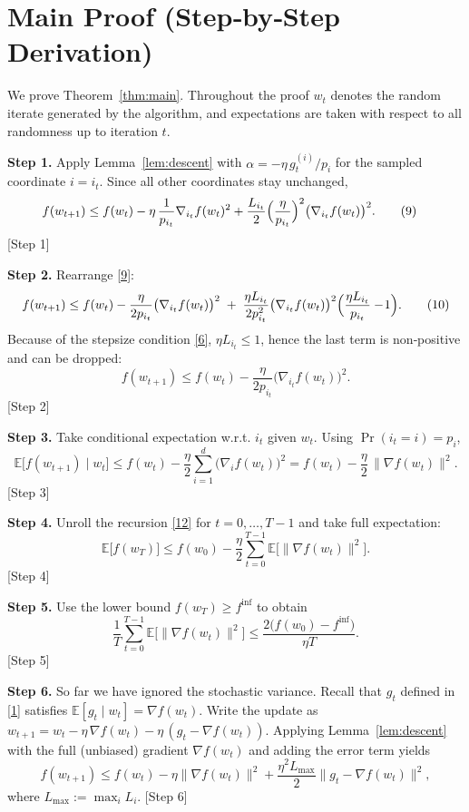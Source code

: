 \documentclass[11pt]{article}
\newcommand{\E}{\mathbb{E}}
\begin{document}
\section*{Main Proof (Step‑by‑Step Derivation)}
We prove Theorem~\ref{thm:main}.  Throughout the proof $w_t$ denotes the
random iterate generated by the algorithm, and expectations are taken
with respect to all randomness up to iteration $t$.

\bigskip
\noindent\textbf{Step 1.}  Apply Lemma~\ref{lem:descent} with
$\alpha=-\eta\,g_t^{(i)}/p_i$ for the sampled coordinate $i=i_t$.
Since all other coordinates stay unchanged,
\begin{align}
f(w_{t+1})
&\le f(w_t)-\eta\,\frac{1}{p_{i_t}}\nabla_{i_t} f(w_t)^{2}
      +\frac{L_{i_t}}{2}\Bigl(\frac{\eta}{p_{i_t}}\Bigr)^{2}
        \bigl(\nabla_{i_t} f(w_t)\bigr)^{2}.
\tag{9}
\end{align}
[Step 1]

\noindent\textbf{Step 2.}  Rearrange \eqref{9}:
\[
f(w_{t+1})\le f(w_t)-\frac{\eta}{2p_{i_t}}
\bigl(\nabla_{i_t} f(w_t)\bigr)^{2}
\;+\;
\frac{\eta L_{i_t}}{2p_{i_t}^{2}}
\bigl(\nabla_{i_t} f(w_t)\bigr)^{2}
\Bigl(\frac{\eta L_{i_t}}{p_{i_t}}-\!1\Bigr).
\tag{10}
\]
Because of the stepsize condition \eqref{6}, $\eta L_{i_t}\le1$,
hence the last term is non‑positive and can be dropped:
\[
f(w_{t+1})\le f(w_t)-\frac{\eta}{2p_{i_t}}
\bigl(\nabla_{i_t} f(w_t)\bigr)^{2}.
\tag{11}
\]
[Step 2]

\noindent\textbf{Step 3.}  Take conditional expectation w.r.t. $i_t$ given
$w_t$.  Using $\Pr(i_t=i)=p_i$,
\[
\E\!\bigl[f(w_{t+1})\mid w_t\bigr]
\le f(w_t)-\frac{\eta}{2}\sum_{i=1}^{d}
\bigl(\nabla_i f(w_t)\bigr)^{2}
= f(w_t)-\frac{\eta}{2}\,\|\nabla f(w_t)\|^{2}.
\tag{12}
\]
[Step 3]

\noindent\textbf{Step 4.}  Unroll the recursion \eqref{12} for $t=0,\dots ,T-1$
and take full expectation:
\[
\E\bigl[f(w_T)\bigr]
\le f(w_0)-\frac{\eta}{2}\sum_{t=0}^{T-1}
\E\!\bigl[\|\nabla f(w_t)\|^{2}\bigr].
\tag{13}
\]
[Step 4]

\noindent\textbf{Step 5.}  Use the lower bound $f(w_T)\ge f^{\inf}$ to obtain
\[
\frac{1}{T}\sum_{t=0}^{T-1}\E\!\bigl[\|\nabla f(w_t)\|^{2}\bigr]
\le\frac{2\bigl(f(w_0)-f^{\inf}\bigr)}{\eta T}.
\tag{14}
\]
[Step 5]

\noindent\textbf{Step 6.}  So far we have ignored the stochastic variance.
Recall that $g_t$ defined in \eqref{1} satisfies $\E[g_t\mid w_t]=\nabla f(w_t)$.
Write the update as $w_{t+1}=w_t-\eta\,\nabla f(w_t)-\eta\,(g_t-\nabla f(w_t))$.
Applying Lemma~\ref{lem:descent} with the full (unbiased) gradient
$\nabla f(w_t)$ and adding the error term yields
\[
f(w_{t+1})\le f(w_t)-\eta\|\nabla f(w_t)\|^{2}
+\frac{\eta^{2}L_{\max}}{2}\|g_t-\nabla f(w_t)\|^{2},
\tag{15}
\]
where $L_{\max}:=\max_i L_i$.
[Step 6]
\end{document}
